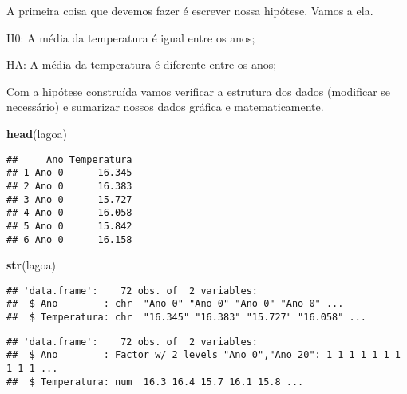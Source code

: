 \documentclass[titlepage, oneside, openany, a4paper]{book}
\newenvironment{Shaded}{\begin{snugshade}}{\end{snugshade}}
\newcommand{\KeywordTok}[1]{\textcolor[rgb]{0.13,0.29,0.53}{\textbf{#1}}}
\newcommand{\NormalTok}[1]{#1}
\newcommand{\OperatorTok}[1]{\textcolor[rgb]{0.81,0.36,0.00}{\textbf{#1}}}
\newcommand{\StringTok}[1]{\textcolor[rgb]{0.31,0.60,0.02}{#1}}
\begin{document}
A primeira coisa que devemos fazer é escrever nossa hipótese. Vamos a ela.

H0: A média da temperatura é igual entre os anos;

HA: A média da temperatura é diferente entre os anos;

Com a hipótese construída vamos verificar a estrutura dos dados (modificar se necessário) e sumarizar nossos dados gráfica e matematicamente.

\begin{Shaded}
\begin{Highlighting}[]
\KeywordTok{head}\NormalTok{(lagoa)}
\end{Highlighting}
\end{Shaded}

\begin{verbatim}
##     Ano Temperatura
## 1 Ano 0      16.345
## 2 Ano 0      16.383
## 3 Ano 0      15.727
## 4 Ano 0      16.058
## 5 Ano 0      15.842
## 6 Ano 0      16.158
\end{verbatim}

\begin{Shaded}
\begin{Highlighting}[]
\KeywordTok{str}\NormalTok{(lagoa)}
\end{Highlighting}
\end{Shaded}

\begin{verbatim}
## 'data.frame':    72 obs. of  2 variables:
##  $ Ano        : chr  "Ano 0" "Ano 0" "Ano 0" "Ano 0" ...
##  $ Temperatura: chr  "16.345" "16.383" "15.727" "16.058" ...
\end{verbatim}

\begin{Shaded}
\end{Shaded}

\begin{verbatim}
## 'data.frame':    72 obs. of  2 variables:
##  $ Ano        : Factor w/ 2 levels "Ano 0","Ano 20": 1 1 1 1 1 1 1 1 1 1 ...
##  $ Temperatura: num  16.3 16.4 15.7 16.1 15.8 ...
\end{verbatim}
\end{document}
